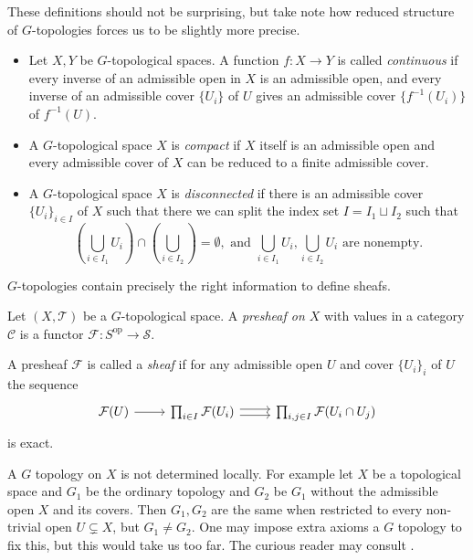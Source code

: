 \begin{definition}
	These definitions should not be surprising, but take note how reduced structure of $G$-topologies forces us to be slightly more precise.  
	\begin{itemize}
		\item  Let $X, Y$ be $G$-topological spaces. 
			A function $f: X \to Y$ is called \emph{continuous} if every inverse of an admissible open in $X$ is an admissible open, and every inverse of an admissible cover $\{U_i\} $ of $U$ gives an admissible cover $\{f^{-1}(U_i)\} $ of $f^{-1}(U)$. 
		\item A $G$-topological space $X$ is \emph{compact} if $X$ itself is an admissible open and every admissible cover of $X$ can be reduced to a finite admissible cover. 
		\item A $G$-topological space $X$ is \emph{disconnected} if there is an admissible cover $\{U_i\} _{i \in I}$ of $X$ such that there we can split the index set $I = I_1 \sqcup I_2$  such that \[
				\left(\bigcup_{i \in  I_1} U_i\right)\cap \left( \bigcup_{i \in I_2}  \right)  = \emptyset, \text{ and } \bigcup_{i \in I_1} U_i, \bigcup_{i \in I_2} U_i \text{ are nonempty}
		.\] 
	\end{itemize}
\end{definition}

$G$-topologies contain precisely the right information to define sheafs. 
\begin{definition}
	Let $(X, \mathcal{T} )$ be a $G$-topological space.
	A \emph{presheaf on $X$} with values in a category $\mathcal{C} $ is a functor $\mathcal{F} :S^{\text{op}} \to \mathcal{S} $. 

	A presheaf $\mathcal{F} $ is called a \emph{sheaf} if for any admissible open  $U$ and cover $\{U_i\}_i $ of $U$ the sequence \[
	\begin{tikzcd}
		\mathcal{F} (U) \rar & \prod_{i \in I} \mathcal{F} (U_i) \rar[shift left]\rar[shift right] & \prod_{i, j \in I} \mathcal{F} (U_{i} \cap U_j)
	\end{tikzcd}
	\] 
	is exact. 
\end{definition}
\begin{remark}\label{rem:g_topology_local}
	A $G$ topology on $X$ is not determined locally. 
	For example let $X$ be a topological space and $G_1$ be the ordinary topology and $G_2$ be $G_1$ without the admissible open $X$ and its covers.  
	Then $G_1, G_2$ are the same when restricted to every non-trivial open  $U \subsetneq X$, but $G_1 \ne G_2$. 
	One may impose extra axioms a $G$ topology to fix this, but this would take us too far. 
	The curious reader may consult \cite[sec.\ 9.1.2]{siegfriedboschNonArchimedeanAnalysisSystematic1984}.
\end{remark}



